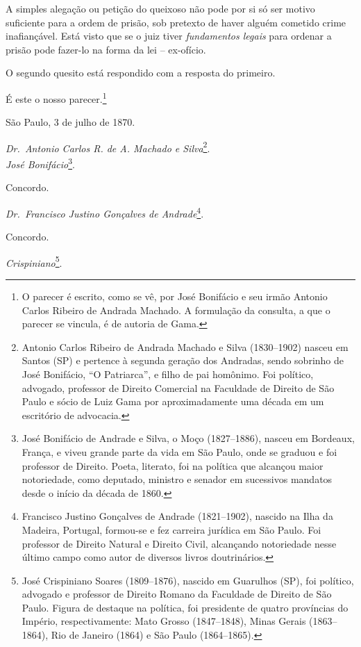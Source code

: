 A simples alegação ou petição do queixoso não pode por si só ser motivo
suficiente para a ordem de prisão, sob pretexto de haver alguém cometido
crime inafiançável. Está visto que se o juiz tiver \emph{fundamentos
legais} para ordenar a prisão pode fazer-lo na forma da lei --
ex-ofício.

O segundo quesito está respondido com a resposta do primeiro.

É este o nosso parecer.\footnote{ O parecer é escrito, como se vê, por
  José Bonifácio e seu irmão Antonio Carlos Ribeiro de Andrada Machado.
  A formulação da consulta, a que o parecer se vincula, é de autoria de
  Gama.}
\begin{flushright}
São Paulo, 3 de julho de 1870.
\end{flushright}
\emph{Dr.~Antonio Carlos R. de A. Machado e Silva}\footnote{ Antonio
  Carlos Ribeiro de Andrada Machado e Silva (1830--1902) nasceu em Santos
  (SP) e pertence à segunda geração dos Andradas, sendo sobrinho de José
  Bonifácio, ``O Patriarca'', e filho de pai homônimo. Foi político,
  advogado, professor de Direito Comercial na Faculdade de Direito de
  São Paulo e sócio de Luiz Gama por aproximadamente uma década em um
  escritório de advocacia.}.\\
\emph{José Bonifácio}\footnote{ José Bonifácio de Andrade e Silva, o
  Moço (1827--1886), nasceu em Bordeaux, França, e viveu grande parte da
  vida em São Paulo, onde se graduou e foi professor de Direito. Poeta,
  literato, foi na política que alcançou maior notoriedade, como
  deputado, ministro e senador em sucessivos mandatos desde o início da
  década de 1860.}.

Concordo.

\emph{Dr.~Francisco Justino Gonçalves de Andrade}\footnote{ Francisco
  Justino Gonçalves de Andrade (1821--1902), nascido na Ilha da Madeira,
  Portugal, formou-se e fez carreira jurídica em São Paulo. Foi
  professor de Direito Natural e Direito Civil, alcançando notoriedade
  nesse último campo como autor de diversos livros doutrinários.}.

Concordo.

\emph{Crispiniano}\footnote{ José Crispiniano Soares (1809--1876),
  nascido em Guarulhos (SP), foi político, advogado e professor de
  Direito Romano da Faculdade de Direito de São Paulo. Figura de
  destaque na política, foi presidente de quatro províncias do Império,
  respectivamente: Mato Grosso (1847--1848), Minas Gerais (1863--1864),
  Rio de Janeiro (1864) e São Paulo (1864--1865).}.

